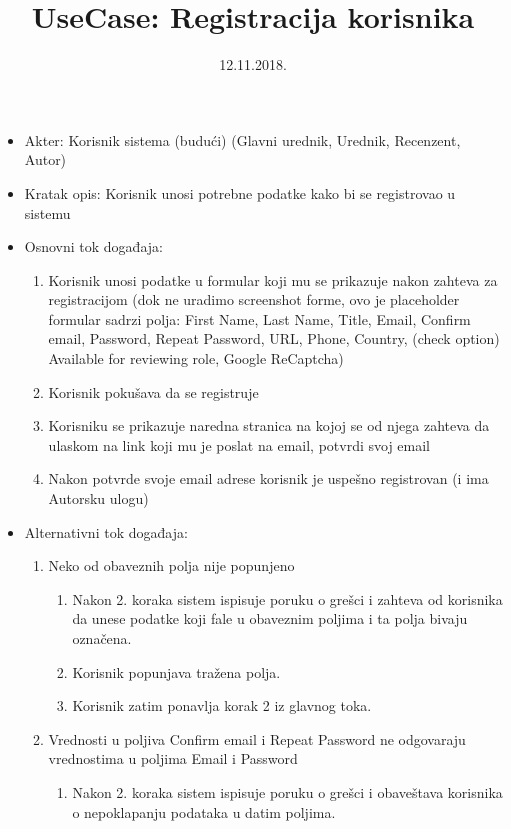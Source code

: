 \documentclass[a4paper]{article}
\title{UseCase: Registracija korisnika}
\date{12.11.2018.}
\begin{document}
\maketitle

\begin{itemize}
    \item Akter: Korisnik sistema (budući) (Glavni urednik, Urednik, Recenzent, Autor)
    \item Kratak opis: Korisnik unosi potrebne podatke kako bi se registrovao u sistemu
    \item Osnovni tok događaja:
        \begin{enumerate}
            \item Korisnik unosi podatke u formular koji mu se prikazuje nakon zahteva za registracijom (dok ne uradimo screenshot forme, ovo je placeholder formular sadrzi polja: First Name, Last Name, Title, Email, Confirm email, Password, Repeat Password, URL, Phone, Country, (check option) Available for reviewing role, Google ReCaptcha)
            \item Korisnik pokušava da se registruje
            \item Korisniku se prikazuje naredna stranica na kojoj se od njega zahteva da ulaskom na link koji mu je poslat na email, potvrdi svoj email
            \item Nakon potvrde svoje email adrese korisnik je uspešno registrovan (i ima Autorsku ulogu)
        \end{enumerate}
    \item Alternativni tok događaja:
        \begin{enumerate}
            \item Neko od obaveznih polja nije popunjeno
                \begin{enumerate}
                    \item Nakon 2. koraka sistem ispisuje poruku o grešci i zahteva od korisnika da unese podatke koji fale u obaveznim poljima i ta polja bivaju označena.
                    \item Korisnik popunjava tražena polja.
                    \item Korisnik zatim ponavlja korak 2 iz glavnog toka.
                \end{enumerate}
            \item Vrednosti u poljiva Confirm email i Repeat Password ne odgovaraju vrednostima u poljima Email i Password
                \begin{enumerate}
                    \item Nakon 2. koraka sistem ispisuje poruku o grešci i obaveštava korisnika o nepoklapanju podataka u datim poljima.

\end{enumerate}
\end{enumerate}
\end{itemize}
\end{document}

